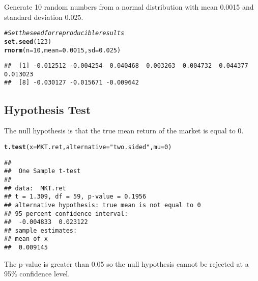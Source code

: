 \documentclass[a4paper]{article}\usepackage[]{graphicx}\usepackage[]{color}
\makeatletter
\newcommand{\hlstr}[1]{\textcolor[rgb]{0.192,0.494,0.8}{#1}}%
\newcommand{\hlcom}[1]{\textcolor[rgb]{0.678,0.584,0.686}{\textit{#1}}}%
\newcommand{\hlkwd}[1]{\textcolor[rgb]{0.737,0.353,0.396}{\textbf{#1}}}%
\newenvironment{kframe}{%
 \def\at@end@of@kframe{}%
 \ifinner\ifhmode%
  \def\at@end@of@kframe{\end{minipage}}%
  \begin{minipage}{\columnwidth}%
 \fi\fi%
 \def\FrameCommand##1{\hskip\@totalleftmargin \hskip-\fboxsep
 \colorbox{shadecolor}{##1}\hskip-\fboxsep
     \hskip-\linewidth \hskip-\@totalleftmargin \hskip\columnwidth}%
 \MakeFramed {\advance\hsize-\width
   \@totalleftmargin\z@ \linewidth\hsize
   \@setminipage}}%
 {\par\unskip\endMakeFramed%
 \at@end@of@kframe}
\newenvironment{knitrout}{}{} %
\makeatother
\begin{document}
Generate 10 random numbers from a normal distribution with mean 0.0015 and standard deviation 0.025.
\begin{knitrout}
\color{fgcolor}\begin{kframe}
\begin{alltt}
\hlcom{# Set the seed for reproducible results}
\hlkwd{set.seed}(123)
\hlkwd{rnorm}(n = 10, mean = 0.0015, sd = 0.025)
\end{alltt}
\begin{verbatim}
##  [1] -0.012512 -0.004254  0.040468  0.003263  0.004732  0.044377  0.013023
##  [8] -0.030127 -0.015671 -0.009642
\end{verbatim}
\end{kframe}
\end{knitrout}


\subsection{Hypothesis Test}
The null hypothesis is that the true mean return of the market is equal to 0.
\begin{knitrout}
\color{fgcolor}\begin{kframe}
\begin{alltt}
\hlkwd{t.test}(x=MKT.ret, alternative=\hlstr{"two.sided"}, mu=0)
\end{alltt}
\begin{verbatim}
## 
## 	One Sample t-test
## 
## data:  MKT.ret
## t = 1.309, df = 59, p-value = 0.1956
## alternative hypothesis: true mean is not equal to 0
## 95 percent confidence interval:
##  -0.004833  0.023122
## sample estimates:
## mean of x 
##  0.009145
\end{verbatim}
\end{kframe}
\end{knitrout}

The p-value is greater than 0.05 so the null hypothesis cannot be rejected at a 95\% confidence level.
\end{document}
